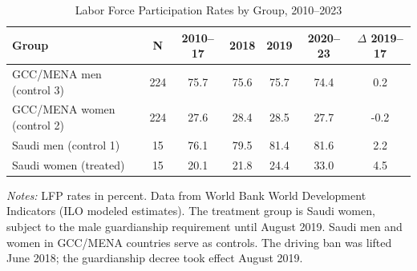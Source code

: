 \begin{table}[htbp]
\centering
\caption{Labor Force Participation Rates by Group, 2010--2023}
\label{tab:summary}
\begin{tabular}{lcccccc}
\hline\hline
Group & N & 2010--17 & 2018 & 2019 & 2020--23 & $\Delta$ 2019--17 \\
\hline
GCC/MENA men (control 3) & 224 & 75.7 & 75.6 & 75.7 & 74.4 & 0.2 \\
GCC/MENA women (control 2) & 224 & 27.6 & 28.4 & 28.5 & 27.7 & -0.2 \\
Saudi men (control 1) & 15 & 76.1 & 79.5 & 81.4 & 81.6 & 2.2 \\
Saudi women (treated) & 15 & 20.1 & 21.8 & 24.4 & 33.0 & 4.5 \\
\hline\hline
\end{tabular}
\begin{minipage}{0.95\textwidth}
{\footnotesize \textit{Notes:} LFP rates in percent. Data from World Bank World Development Indicators (ILO modeled estimates). The treatment group is Saudi women, subject to the male guardianship requirement until August 2019. Saudi men and women in GCC/MENA countries serve as controls. The driving ban was lifted June 2018; the guardianship decree took effect August 2019.}
\end{minipage}
\end{table}
